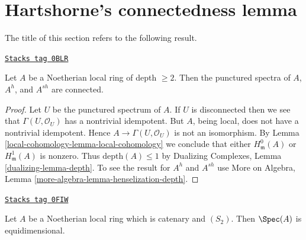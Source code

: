 \section{Hartshorne's connectedness lemma}
\label{local-cohomology-section-hartshorne-connectedness}
The title of this section refers to the following result.

\begin{lemma}
\label{local-cohomology-lemma-depth-2-connected-punctured-spectrum}
\href{https://stacks.math.columbia.edu/tag/0BLR}{\texttt{Stacks tag 0BLR}}

\begin{reference}
\cite[Proposition 2.1]{Hartshorne-connectedness}
\end{reference}

Let $A$ be a Noetherian local ring of depth $\geq 2$.
Then the punctured spectra of $A$, $A^h$, and $A^{sh}$ are connected.
\end{lemma}

\begin{proof}
Let $U$ be the punctured spectrum of $A$.
If $U$ is disconnected then we see that
$\Gamma(U, \mathcal{O}_U)$ has a nontrivial idempotent.
But $A$, being local, does not have a nontrivial idempotent.
Hence $A \to \Gamma(U, \mathcal{O}_U)$ is not an isomorphism.
By Lemma \ref{local-cohomology-lemma-local-cohomology}
we conclude that either $H^0_\mathfrak m(A)$ or $H^1_\mathfrak m(A)$
is nonzero. Thus $\text{depth}(A) \leq 1$ by
Dualizing Complexes, Lemma \ref{dualizing-lemma-depth}.
To see the result for $A^h$ and $A^{sh}$ use
More on Algebra, Lemma \ref{more-algebra-lemma-henselization-depth}.
\end{proof}

\begin{lemma}
\label{local-cohomology-lemma-catenary-S2-equidimensional}
\href{https://stacks.math.columbia.edu/tag/0FIW}{\texttt{Stacks tag 0FIW}}

\begin{reference}
\cite[IV Corollary 5.10.9]{EGA}
\end{reference}
Let $A$ be a Noetherian local ring which is catenary and $(S_2)$.
Then $\Spec(A)$ is equidimensional.
\end{lemma}

